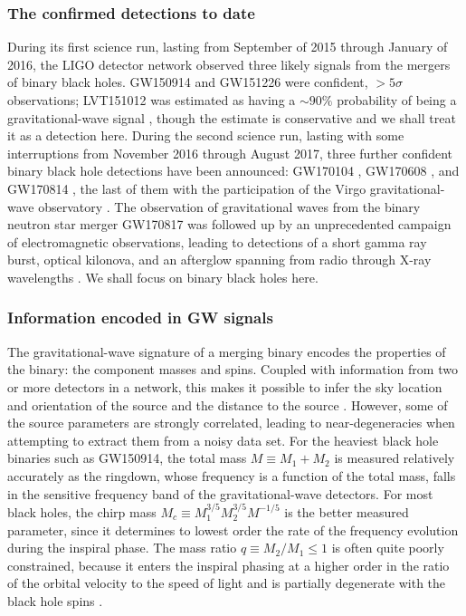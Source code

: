 \documentclass[iop,onecolumn]{revtex4}
\newcommand{\ilya}[1]{\textcolor{magenta}{#1}}
\begin{document}
\subsubsection{The confirmed detections to date}
During its first science run, lasting from September of 2015 through January of 2016, the LIGO detector network observed three likely signals from the mergers of binary black holes.  GW150914 \citep{GW150914} and GW151226 \citep{GW151226} were confident, $> 5\sigma$ observations; LVT151012 was estimated as having a $\sim 90\%$ probability of being a gravitational-wave signal \citep{GW150914:rates,BBH:O1}, though the estimate is conservative and we shall treat it as a detection here.  During the second science run, lasting with some interruptions from November 2016 through August 2017, three further confident binary black hole detections have been announced: GW170104 \citep{GW170104},  GW170608 \citep{GW170608}, and GW170814 \citep{GW170814}, the last of them with the participation of the Virgo gravitational-wave observatory \ilya{\citep{AdvVirgo}}.   The observation of gravitational waves from the binary neutron star merger GW170817 \citep{GW170817} was followed up by an unprecedented campaign of electromagnetic observations, leading to detections of a short gamma ray burst, optical kilonova, and an afterglow spanning from radio through X-ray wavelengths \citep{GW170817:GRB,GW170817:MMA}.  We shall focus on binary black holes here.

\subsubsection{Information encoded in GW signals}
The gravitational-wave signature of a merging binary encodes the properties of the binary: the component masses and spins. Coupled with information from two or more detectors in a network, this makes it possible to infer the sky location and orientation of the source and the distance to the source \citep{Veitch:2015,GW150914:PE}.  However, some of the source parameters are strongly correlated, leading to near-degeneracies when attempting to extract them from a noisy data set.   For the heaviest black hole binaries such as GW150914, the total mass $M \equiv M_1 + M_2$ is measured relatively accurately as the ringdown, whose frequency is a function of the total mass, falls in the sensitive frequency band of the gravitational-wave detectors.  For most black holes, the chirp mass $M_c \equiv M_1^{3/5} M_2^{3/5} M^{-1/5}$ is the better measured parameter, since it determines to lowest order the rate of the frequency evolution during the inspiral phase.  The mass ratio $q\equiv M_2/M_1 \leq 1$ is often quite poorly constrained, because it enters the inspiral phasing at a higher order in the ratio of the orbital velocity to the speed of light and is partially degenerate with the black hole spins \citep[e.g.,][]{PoissonWill:1995}.  
\end{document}
